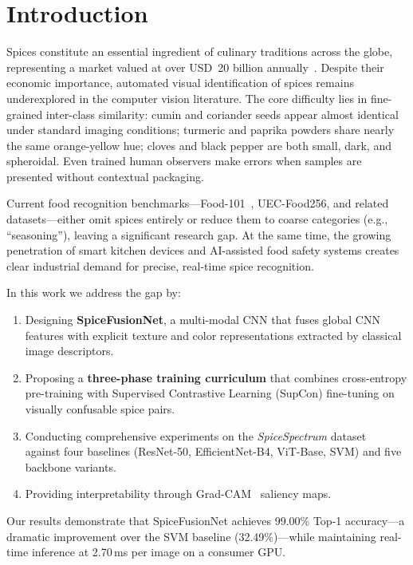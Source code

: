 \documentclass[conference]{IEEEtran}
\begin{document}
\section{Introduction}
\label{sec:intro}

Spices constitute an essential ingredient of culinary traditions across the globe,
representing a market valued at over USD~20 billion annually~\cite{spicemarket2023}.
Despite their economic importance, automated visual identification of spices remains
underexplored in the computer vision literature. The core difficulty lies in
fine-grained inter-class similarity: cumin and coriander seeds appear almost
identical under standard imaging conditions; turmeric and paprika powders share
nearly the same orange-yellow hue; cloves and black pepper are both small, dark, and
spheroidal. Even trained human observers make errors when samples are presented
without contextual packaging.

Current food recognition benchmarks—Food-101~\cite{bossard14}, UEC-Food256, and
related datasets—either omit spices entirely or reduce them to coarse categories
(e.g., ``seasoning''), leaving a significant research gap. At the same time, the
growing penetration of smart kitchen devices and AI-assisted food safety systems
creates clear industrial demand for precise, real-time spice recognition.

In this work we address the gap by:
\begin{enumerate}
    \item Designing \textbf{SpiceFusionNet}, a multi-modal CNN that fuses global CNN
          features with explicit texture and color representations extracted by
          classical image descriptors.
    \item Proposing a \textbf{three-phase training curriculum} that combines
          cross-entropy pre-training with Supervised Contrastive Learning (SupCon)
          fine-tuning on visually confusable spice pairs.
    \item Conducting comprehensive experiments on the \textit{SpiceSpectrum}
          dataset~\cite{spicespectrum2025} against four baselines
          (ResNet-50, EfficientNet-B4, ViT-Base, SVM) and five backbone variants.
    \item Providing interpretability through Grad-CAM~\cite{selvaraju2017grad}
          saliency maps.
\end{enumerate}

Our results demonstrate that SpiceFusionNet achieves 99.00\% Top-1 accuracy—a
dramatic improvement over the SVM baseline (32.49\%)—while maintaining real-time
inference at 2.70\,ms per image on a consumer GPU.
\end{document}
